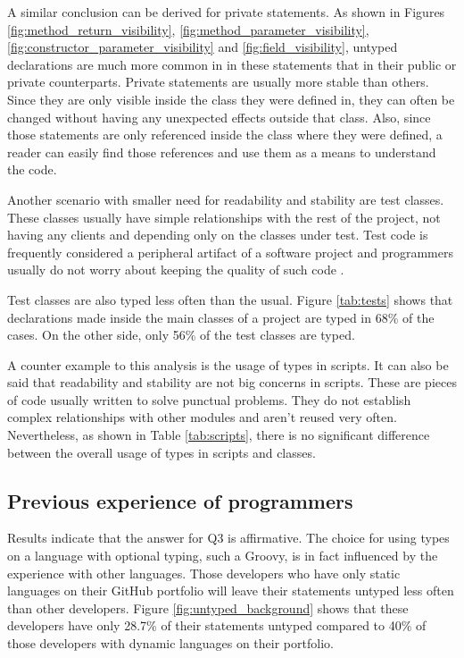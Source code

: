 \documentclass[preprint]{sigplanconf}
\begin{document}
A similar conclusion can be derived for private statements.
As shown in Figures \ref{fig:method_return_visibility}, \ref{fig:method_parameter_visibility}, \ref{fig:constructor_parameter_visibility} and \ref{fig:field_visibility}, untyped declarations are much more common in in these statements that in their public or private counterparts.
Private statements are usually more stable than others.
Since they are only visible inside the class they were defined in, they can often be changed without having any unexpected effects outside that class.
Also, since those statements are only referenced inside the class where they were defined, a reader can easily find those references and use them as a means to understand the code.

Another scenario with smaller need for readability and stability are test classes.
These classes usually have simple relationships with the rest of the project, not having any clients and depending only on the classes under test.
Test code is frequently considered a peripheral artifact of a software project and programmers usually do not worry about keeping the quality of such code \cite{Meszaros07}.

Test classes are also typed less often than the usual.
Figure \ref{tab:tests} shows that declarations made inside the main classes of a project are typed in 68\% of the cases.
On the other side, only 56\% of the test classes are typed.

A counter example to this analysis is the usage of types in scripts.
It can also be said that readability and stability are not big concerns in scripts.
These are pieces of code usually written to solve punctual problems.
They do not establish complex relationships with other modules and aren't reused very often.
Nevertheless, as shown in Table \ref{tab:scripts}, there is no significant difference between the overall usage of types in scripts and classes.


\subsection{Previous experience of programmers}
Results indicate that the answer for Q3 is affirmative.
The choice for using types on a language with optional typing, such a Groovy, is in fact influenced by the experience  with other languages.
Those developers who have only static languages on their GitHub portfolio will leave their statements untyped less often than other developers.
Figure \ref{fig:untyped_background} shows that these developers have only 28.7\% of their statements untyped compared to 40\% of those developers with dynamic languages on their portfolio. 
\end{document}
